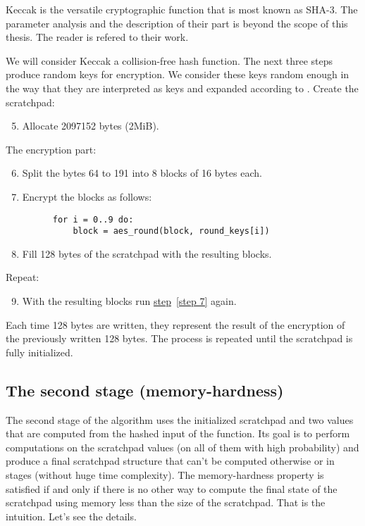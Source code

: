 Keccak is the versatile cryptographic function that is most known as SHA-3. The parameter analysis and the description of their part is beyond the scope of this thesis. The reader is refered to their work.

We will consider Keccak a collision-free hash function. The next three steps produce random keys for encryption. We consider these keys random enough in the way that they are interpreted as keys and expanded according to \cite{nla.cat-vn4183631}. Create the scratchpad:
\begin{enumerate}
  \setcounter{enumi}{4}
  \item Allocate 2097152 bytes (2MiB).
\end{enumerate}
The encryption part:
\begin{enumerate}
  \setcounter{enumi}{5}
  \item Split the bytes 64 to 191 into 8 blocks of 16 bytes each.
  \item \label{step 7} Encrypt the blocks as follows:
    \begin{verbatim}
      for i = 0..9 do:
          block = aes_round(block, round_keys[i])
    \end{verbatim}
\end{enumerate}
\begin{enumerate}
  \setcounter{enumi}{7}
  \item Fill 128 bytes of the scratchpad with the resulting blocks.
\end{enumerate}
Repeat:
\begin{enumerate}
  \setcounter{enumi}{8}
  \item With the resulting blocks run \hyperref[step 7]{step}~\ref{step 7} again.
\end{enumerate}

Each time 128 bytes are written, they represent the
result of the encryption of the previously written 128 bytes. The
process is repeated until the scratchpad is fully initialized.

\subsection{The second stage (memory-hardness)}
The second stage of the algorithm uses the initialized scratchpad and two values that are computed from the hashed input of the function. Its goal is to perform computations on the scratchpad values (on all of them with high probability) and produce a final scratchpad structure that can't be computed otherwise or in stages (without huge time complexity). The memory-hardness property is satisfied if and only if there is no other way to compute the final state of the scratchpad using memory less than the size of the scratchpad. That is the intuition. Let's see the details.

